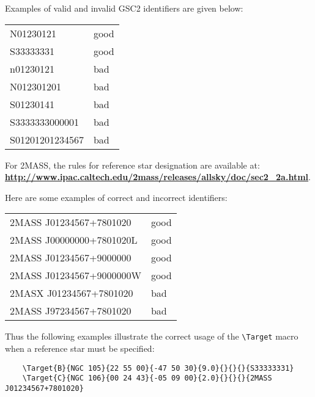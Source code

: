 \documentclass{article}
\begin{document}
\smallskip

Examples of valid and invalid GSC2 identifiers are given below:

\begin{center}
\begin{tabular}{ll}
    N01230121           & good\\
    S33333331           & good\\
  n01230121             & bad\\
 N012301201             & bad\\
    S01230141           & bad\\
    S3333333000001      & bad\\
    S01201201234567     & bad\\
\end{tabular}
\end{center}



For 2MASS, the rules for reference star designation are available at:\\
  \href{http://www.ipac.caltech.edu/2mass/releases/allsky/doc/sec2_2a.html}{\bf
    \underline{http://www.ipac.caltech.edu/2mass/releases/allsky/doc/sec2\_2a.html}}. 

\smallskip

Here are some examples of correct and incorrect identifiers:

\begin{center}
\begin{tabular}{ll}
 2MASS J01234567+7801020      & good\\
 2MASS J00000000+7801020L     & good\\
 2MASS J01234567+9000000      & good\\
 2MASS J01234567+9000000W     & good\\
 2MASX J01234567+7801020      & bad\\
 2MASS J97234567+7801020      & bad\\
\end{tabular}
\end{center}

Thus the following examples illustrate the correct usage of the
\verb|\Target| macro when a reference star must be specified:
\begin{verbatim}
    \Target{B}{NGC 105}{22 55 00}{-47 50 30}{9.0}{}{}{}{S33333331}
    \Target{C}{NGC 106}{00 24 43}{-05 09 00}{2.0}{}{}{}{2MASS J01234567+7801020}
\end{verbatim}
\end{document}
